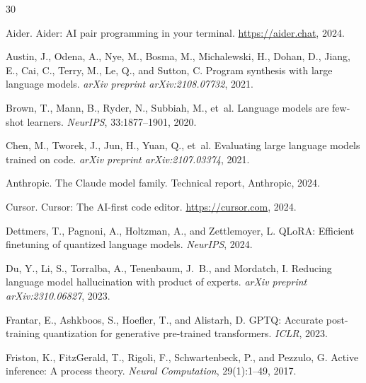 \documentclass[11pt]{article}
\begin{document}

\begin{thebibliography}{30}

Aider.
\newblock Aider: AI pair programming in your terminal.
\newblock \url{https://aider.chat}, 2024.

Austin, J., Odena, A., Nye, M., Bosma, M., Michalewski, H., Dohan, D., Jiang,
  E., Cai, C., Terry, M., Le, Q., and Sutton, C.
\newblock Program synthesis with large language models.
\newblock \emph{arXiv preprint arXiv:2108.07732}, 2021.

Brown, T., Mann, B., Ryder, N., Subbiah, M., et~al.
\newblock Language models are few-shot learners.
\newblock \emph{NeurIPS}, 33:1877--1901, 2020.

Chen, M., Tworek, J., Jun, H., Yuan, Q., et~al.
\newblock Evaluating large language models trained on code.
\newblock \emph{arXiv preprint arXiv:2107.03374}, 2021.

Anthropic.
\newblock The Claude model family.
\newblock Technical report, Anthropic, 2024.

Cursor.
\newblock Cursor: The AI-first code editor.
\newblock \url{https://cursor.com}, 2024.

Dettmers, T., Pagnoni, A., Holtzman, A., and Zettlemoyer, L.
\newblock QLoRA: Efficient finetuning of quantized language models.
\newblock \emph{NeurIPS}, 2024.

Du, Y., Li, S., Torralba, A., Tenenbaum, J.~B., and Mordatch, I.
\newblock Reducing language model hallucination with product of experts.
\newblock \emph{arXiv preprint arXiv:2310.06827}, 2023.

Frantar, E., Ashkboos, S., Hoefler, T., and Alistarh, D.
\newblock GPTQ: Accurate post-training quantization for generative pre-trained
  transformers.
\newblock \emph{ICLR}, 2023.

Friston, K., FitzGerald, T., Rigoli, F., Schwartenbeck, P., and Pezzulo, G.
\newblock Active inference: A process theory.
\newblock \emph{Neural Computation}, 29(1):1--49, 2017.


\end{thebibliography}
\end{document}
